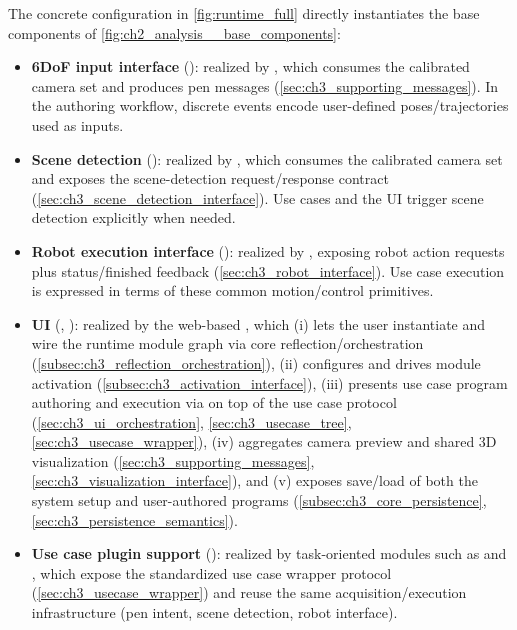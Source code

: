 The concrete configuration in \autoref{fig:runtime_full} directly instantiates the base components of \autoref{fig:ch2_analysis__base_components}:
\begin{itemize}
    \item \textbf{6DoF input interface} (): realized by , which consumes the calibrated camera set and produces pen messages
    (\autoref{sec:ch3_supporting_messages}). In the authoring workflow, discrete  events encode user-defined poses/trajectories used as  inputs.

    \item \textbf{Scene detection} (): realized by , which consumes the calibrated camera set and exposes the scene-detection request/response contract
    (\autoref{sec:ch3_scene_detection_interface}). Use cases and the UI trigger scene detection explicitly when needed.

    \item \textbf{Robot execution interface} (): realized by , exposing robot action requests plus status/finished feedback
    (\autoref{sec:ch3_robot_interface}). Use case execution is expressed in terms of these common motion/control primitives.

    \item \textbf{UI} (, ): realized by the web-based , which (i) lets the user instantiate and wire the runtime module graph via core reflection/orchestration (\autoref{subsec:ch3_reflection_orchestration}), (ii) configures and drives module activation (\autoref{subsec:ch3_activation_interface}), (iii) presents use case program authoring and execution via  on top of the use case protocol (\autoref{sec:ch3_ui_orchestration}, \autoref{sec:ch3_usecase_tree}, \autoref{sec:ch3_usecase_wrapper}), (iv) aggregates camera preview and shared 3D visualization (\autoref{sec:ch3_supporting_messages}, \autoref{sec:ch3_visualization_interface}), and (v) exposes save/load of both the system setup and user-authored programs (\autoref{subsec:ch3_core_persistence}, \autoref{sec:ch3_persistence_semantics}).

    \item \textbf{Use case plugin support} (): realized by task-oriented modules such as  and ,
    which expose the standardized use case wrapper protocol (\autoref{sec:ch3_usecase_wrapper}) and reuse the same acquisition/execution infrastructure (pen intent, scene detection, robot interface).
\end{itemize}

